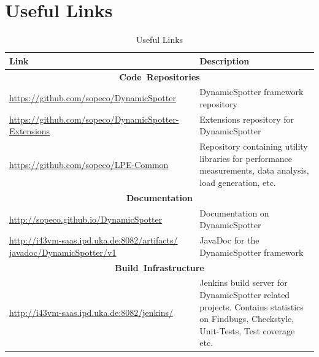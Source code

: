 \documentclass{report}
\newcommand{\DS}{DynamicSpotter }
\newcommand{\link}[1]{\textcolor[rgb]{0.0,0.0,1.0}{\href{#1}{#1}}}
\begin{document}
\section{Useful Links}
\label{sec:links}
\begin{table}[h]
\centering
\begin{tabular}{p{}p{}}
\toprule
 \textbf{Link} & \textbf{Description}\\
\midrule
\midrule
\multicolumn{2}{c}{\mbox{\textbf{Code Repositories}}}\\
\midrule
\small{\link{https://github.com/sopeco/DynamicSpotter}} & \DS framework
repository\\
\midrule
\small{\link{https://github.com/sopeco/DynamicSpotter-Extensions}}
& Extensions repository for \DS\\
\midrule
\small{\link{https://github.com/sopeco/LPE-Common}} & Repository containing
utility libraries for performance measurements, data analysis, load generation, etc.\\
\midrule
\multicolumn{2}{c}{\mbox{\textbf{Documentation}}}\\
\midrule
\small{\link{http://sopeco.github.io/DynamicSpotter}}
& Documentation on \DS\\
\midrule
\small{\textcolor[rgb]{0.0,0.0,1.0}{\href{http://i43vm-saas.ipd.uka.de:8082/artifacts/javadoc/DynamicSpotter/v1}{http://i43vm-saas.ipd.uka.de:8082/artifacts/
javadoc/DynamicSpotter/v1}}} & JavaDoc for the \DS framework\\
\midrule
\multicolumn{2}{c}{\mbox{\textbf{Build Infrastructure}}}\\
\midrule
\small{\link{http://i43vm-saas.ipd.uka.de:8082/jenkins/}}
& Jenkins build server for \DS related projects. Contains statistics on Findbugs, Checkstyle, Unit-Tests, Test
coverage etc.\\
\bottomrule
\end{tabular}
\caption{Useful Links}
\label{tab:usefulLinks}
\end{table}



\end{document}
